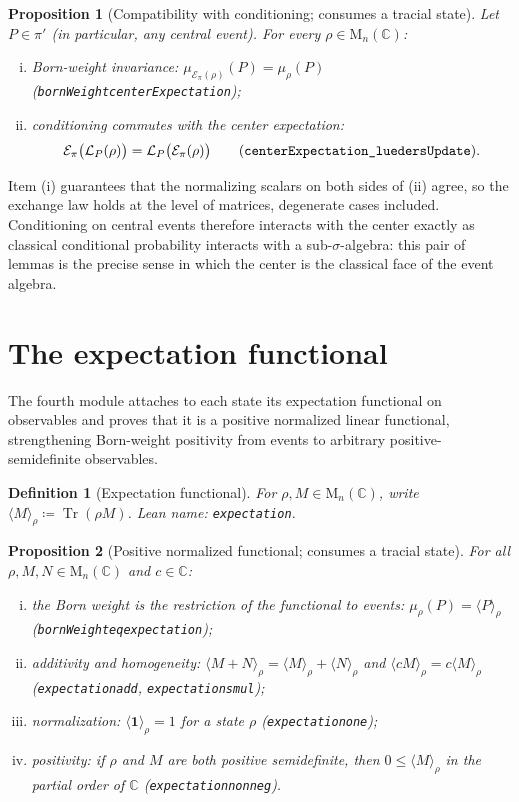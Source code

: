 \documentclass[11pt]{article}
\renewcommand{\_}{\textunderscore\allowbreak}
\newtheorem{definition}{Definition}
\newtheorem{proposition}{Proposition}
\theoremstyle{remark}
\newcommand{\C}{\mathbb C}
\newcommand{\Mn}{\mathrm{M}_n(\C)}
\newcommand{\Tr}{\operatorname{Tr}}
\newcommand{\one}{\mathbf 1}
\newcommand{\pinch}{\mathcal E}
\newcommand{\lued}{\mathcal L}
\begin{document}
\begin{proposition}[Compatibility with conditioning; consumes a tracial state]
\label{prop:compat}
Let $P \in \pi'$ (in particular, any central event). For every $\rho \in \Mn$:
\begin{enumerate}[(i)]
\item Born-weight invariance: $\mu_{\pinch_\pi(\rho)}(P) = \mu_\rho(P)$ (\texttt{bornWeight\_centerExpectation});
\item conditioning commutes with the center expectation:
\[
\pinch_\pi\bigl(\lued_P(\rho)\bigr) = \lued_P\bigl(\pinch_\pi(\rho)\bigr)
\qquad (\texttt{centerExpectation\_luedersUpdate}).
\]
\end{enumerate}
\end{proposition}

Item (i) guarantees that the normalizing scalars on both sides of (ii) agree, so the exchange law holds at the level of matrices, degenerate cases included. Conditioning on central events therefore interacts with the center exactly as classical conditional probability interacts with a sub-$\sigma$-algebra: this pair of lemmas is the precise sense in which the center is the classical face of the event algebra.

\section{The expectation functional}
\label{sec:functional}

The fourth module attaches to each state its expectation functional on observables and proves that it is a positive normalized linear functional, strengthening Born-weight positivity from events to arbitrary positive-semidefinite observables.

\begin{definition}[Expectation functional]
\label{def:expectation}
For $\rho, M \in \Mn$, write $\langle M \rangle_\rho \coloneqq \Tr(\rho M)$. Lean name: \texttt{expectation}.
\end{definition}

\begin{proposition}[Positive normalized functional; consumes a tracial state]
\label{prop:functional}
For all $\rho, M, N \in \Mn$ and $c \in \C$:
\begin{enumerate}[(i)]
\item the Born weight is the restriction of the functional to events: $\mu_\rho(P) = \langle P \rangle_\rho$ (\texttt{bornWeight\_eq\_expectation});
\item additivity and homogeneity: $\langle M + N \rangle_\rho = \langle M \rangle_\rho + \langle N \rangle_\rho$ and $\langle cM \rangle_\rho = c \langle M \rangle_\rho$ (\texttt{expectation\_add}, \texttt{expectation\_smul});
\item normalization: $\langle \one \rangle_\rho = 1$ for a state $\rho$ (\texttt{expectation\_one});
\item positivity: if $\rho$ and $M$ are both positive semidefinite, then $0 \le \langle M \rangle_\rho$ in the partial order of $\C$ (\texttt{expectation\_nonneg}).
\end{enumerate}
\end{proposition}
\end{document}
